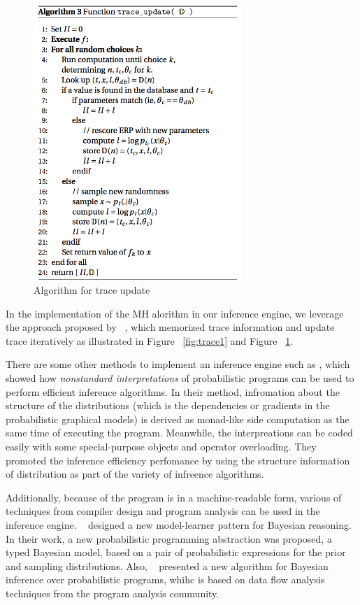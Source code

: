\begin{figure}
    \centering
    \includegraphics[width=0.7\textwidth]{figures/trace2.png}
    \caption{Algorithm for trace update}
    \label{fig:trace2}
\end{figure}

In the implementation of the MH alorithm in our inference engine, we leverage the approach proposed by ~\cite{lightweight}, which memorized trace information and update trace iteratively as illustrated in Figure ~\ref{fig:trace1} and Figure ~\ref{fig:trace2}. 

There are some other methods to implement an inference engine such as \cite{nonstandard}, which showed how \textit{nonstandard interpretations} of probabilistic programs can be used to perform efficient inference algorithms. In their method, infromation about the structure of the distributions (which is the dependencies or gradients in the probabilistic graphical models) is derived as monad-like side computation as the same time of executing the program. Meanwhile, the interpreations can be coded easily with some special-purpose objects and operator overloading. They promoted the inference efficiency perfomance by using the structure information of distribution as part of the variety of infreence algorithms.

Additionally, because of the program is in a machine-readable form, various of techniques from compiler design and program analysis can be used in the inference engine. ~\cite{gordon2013} designed a new model-learner pattern for Bayesian reasoning. In their work, a new probabilistic programming abstraction was proposed, a typed Bayesian model, based on a pair of probabilistic expressions for the prior and sampling distributions. Also, ~\cite{dataflow} presented a new algorithm for Bayesian inference over probabilistic programs, whihc is based on data flow analysis techniques from the program analysis community.

